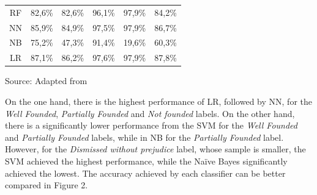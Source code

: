 \begin{table}[htb]
\begin{tabular}{crrrrr}
RF                 & 82,6\%                                                                              & 82,6\%                                                                                & 96,1\%                                                                             & 97,9\%                                                                                               & 84,2\%                                                                                \\\hdashline
NN                 & 85,9\%                                                                              & 84,9\%                                                                                & 97,5\%                                                                             & 97,9\%                                                                                               & 86,7\%                                                                                \\\hdashline
NB                 & 75,2\%                                                                              & 47,3\%                                                                                & 91,4\%                                                                             & 19,6\%                                                                                               & 60,3\%                                                                                \\\hdashline
LR                 & 87,1\%                                                                              & 86,2\%                                                                                & 97,6\%                                                                             & 97,9\%                                                                                               & 87,8\%                                                                                \\ \hline
\end{tabular}

Source: Adapted from \textcite{Sabo2019}
\end{table}

On the one hand, there is the highest performance of LR, followed by NN, for the \emph{Well Founded}, \emph{Partially Founded} and \emph{Not founded} labels. On the other hand, there is a significantly lower performance from the SVM for the \emph{Well Founded} and \emph{Partially Founded} labels, while in NB for the \emph{Partially Founded} label. However, for the \emph{Dismissed without prejudice} label, whose sample is smaller, the SVM achieved the highest performance, while the Naïve Bayes significantly achieved the lowest. The accuracy achieved by each classifier can be better compared in Figure 2. 


